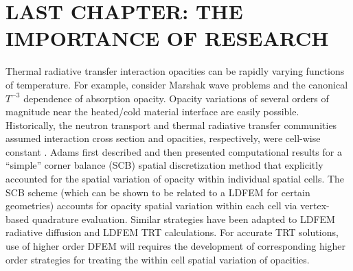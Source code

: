 %
%
%



\chapter{\uppercase{Last Chapter: The Importance of Research}}
\label{sec:chapter3_variable_xs}

Thermal radiative transfer interaction opacities can be rapidly varying functions of temperature.  
For example, consider Marshak wave problems and the canonical $T^{-3}$ dependence \cite{ober_shadid} of absorption opacity.
Opacity variations of several orders of magnitude near the heated/cold material interface are easily possible.
Historically, the neutron transport and thermal radiative transfer communities assumed interaction cross section and opacities, respectively, were cell-wise constant \cite{adams,lewis_book,morel_radtran}.
Adams first described \cite{adams_scb} and then presented computational results \cite{adams_nowak} for a ``simple'' corner balance (SCB) spatial discretization method that explicitly accounted for the spatial variation of opacity within individual spatial cells.
The SCB scheme (which can be shown to be related to a LDFEM for certain geometries) accounts for opacity spatial variation within each cell via vertex-based quadrature evaluation.  
Similar strategies have been adapted to LDFEM radiative diffusion \cite{ober_shadid} and LDFEM TRT \cite{warsa_lmfga} calculations.
For accurate TRT solutions, use of higher order DFEM will requires the development of corresponding higher order strategies  for treating the within cell spatial variation of opacities.


